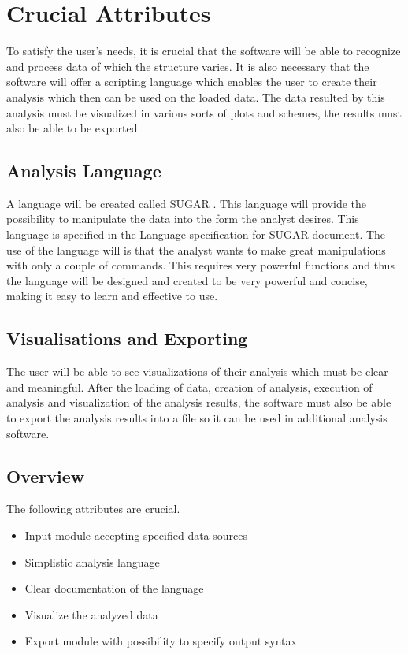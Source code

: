 \documentclass[a4paper]{article}
\begin{document}
\section{Crucial Attributes}
To satisfy the user's needs, it is crucial that the software will be able to recognize and process data of which the structure varies. It is also necessary that the software will offer a scripting language which enables the user to create their analysis which then can be used on the loaded data. The data resulted by this analysis must be visualized in various sorts of plots and  schemes, the results must also be able to be exported. 

\subsection{Analysis Language}
A language will be created called SUGAR \cite{sugar}. This language will provide the possibility to manipulate the data into the form the analyst desires. This language is specified in the Language specification for SUGAR document. The use of the language will is that the analyst wants to make great manipulations with only a couple of commands. This requires very powerful functions and thus the language will be designed and created to be very powerful and concise, making it easy to learn and effective to use.

\subsection{Visualisations and Exporting}
The user will be able to see visualizations of their analysis which must be clear and meaningful. After the loading of data, creation of analysis, execution of analysis and visualization of the analysis results, the software must also be able to export the analysis results into a file so it can be used in additional analysis software. 

\subsection{Overview}
The following attributes are crucial.
\begin{itemize}
\item Input module accepting specified data sources
\item Simplistic analysis language
\item Clear documentation of the language
\item Visualize the analyzed data
\item Export module with possibility to specify output syntax
\end{itemize}
\end{document}
